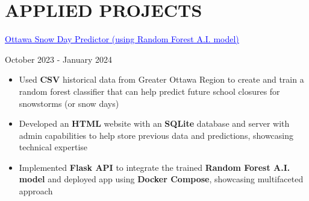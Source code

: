 \documentclass[a4paper,11pt]{article}
\begin{document}
\section{APPLIED PROJECTS}
\begin{minipage}{.65\linewidth}
    \href{https://github.com/JeremyFriesenGitHub/A.I.-Snow-Day-Predictor}{\textcolor{blue}{\uline{Ottawa Snow Day Predictor (using Random Forest A.I. model)}}} 
\end{minipage}
\hfill
\begin{minipage}{.34\linewidth}
    \flushright
    October 2023 - January 2024
\end{minipage}
\begin{minipage}{\linewidth}
\vspace{10pt}
\begin{itemize}
    \item Used \textbf{CSV} historical data from Greater Ottawa Region to create and train a random forest classifier that can help predict future school closures for snowstorms (or snow days)
    \item Developed an \textbf{HTML} website with an \textbf{SQLite} database and server with admin capabilities to help store previous data and predictions, showcasing technical expertise
     \item Implemented \textbf{Flask API} to integrate the trained \textbf{Random Forest A.I. model} and deployed app using \textbf{Docker Compose}, showcasing multifaceted approach
  \end{itemize}
\end{minipage}
\end{document}
